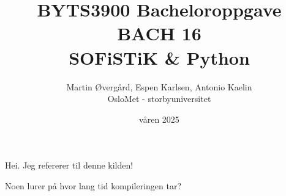 \documentclass[12pt, norsk]{article}
\title{BYTS3900 Bacheloroppgave \\ BACH 16\\SOFiSTiK \& Python}
\author{Martin Øvergård, Espen Karlsen, Antonio Kaelin\\OsloMet - storbyuniversitet}
\date{våren 2025}
\begin{document}
\maketitle

Hei. Jeg refererer til denne kilden! \parencite[s. 27]{testreferanse}


Noen lurer på hvor lang tid kompileringen tar?



\printbibliography
\end{document}
